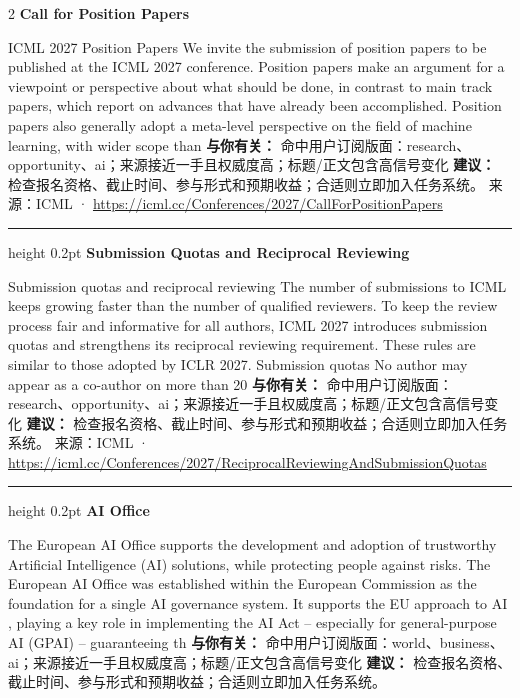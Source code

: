 \documentclass[10.5pt]{ctexart}
\begin{document}
\begin{multicols}{2}
{\large\bfseries Call for Position Papers}\par
ICML 2027 Position Papers We invite the submission of position papers to be published at the ICML 2027 conference. Position papers make an argument for a viewpoint or perspective about what should be done, in contrast to main track papers, which report on advances that have already been accomplished. Position papers also generally adopt a meta-level perspective on the field of machine learning, with wider scope than 
\textbf{与你有关：} 命中用户订阅版面：research、opportunity、ai；来源接近一手且权威度高；标题/正文包含高信号变化
\textbf{建议：} 检查报名资格、截止时间、参与形式和预期收益；合适则立即加入任务系统。
{\footnotesize\color{ormuted} 来源：ICML · \url{https://icml.cc/Conferences/2027/CallForPositionPapers}}
\vspace{2mm}
\hrule height 0.2pt
\vspace{2mm}
{\large\bfseries Submission Quotas and Reciprocal Reviewing}\par
Submission quotas and reciprocal reviewing The number of submissions to ICML keeps growing faster than the number of qualified reviewers. To keep the review process fair and informative for all authors, ICML 2027 introduces submission quotas and strengthens its reciprocal reviewing requirement. These rules are similar to those adopted by ICLR 2027. Submission quotas No author may appear as a co-author on more than 20
\textbf{与你有关：} 命中用户订阅版面：research、opportunity、ai；来源接近一手且权威度高；标题/正文包含高信号变化
\textbf{建议：} 检查报名资格、截止时间、参与形式和预期收益；合适则立即加入任务系统。
{\footnotesize\color{ormuted} 来源：ICML · \url{https://icml.cc/Conferences/2027/ReciprocalReviewingAndSubmissionQuotas}}
\vspace{2mm}
\hrule height 0.2pt
\vspace{2mm}
{\large\bfseries AI Office}\par
The European AI Office supports the development and adoption of trustworthy Artificial Intelligence (AI) solutions, while protecting people against risks. The European AI Office was established within the European Commission as the foundation for a single AI governance system. It supports the EU approach to AI , playing a key role in implementing the AI Act – especially for general-purpose AI (GPAI) – guaranteeing th
\textbf{与你有关：} 命中用户订阅版面：world、business、ai；来源接近一手且权威度高；标题/正文包含高信号变化
\textbf{建议：} 检查报名资格、截止时间、参与形式和预期收益；合适则立即加入任务系统。

\end{multicols}
\end{document}
